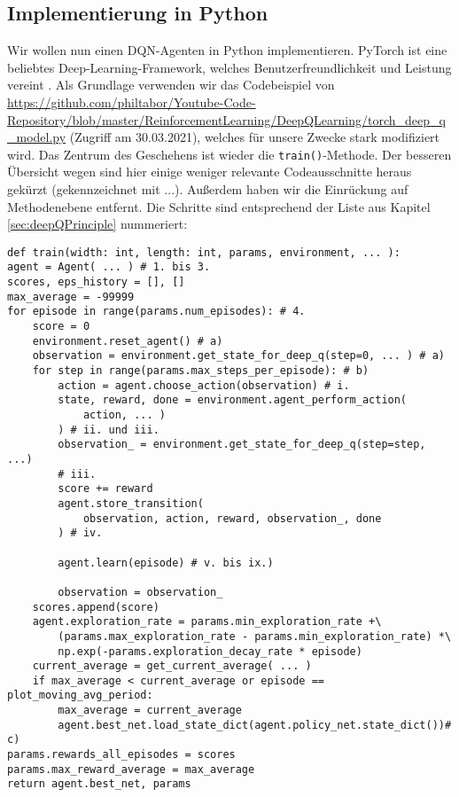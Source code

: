 \subsection{Implementierung in Python} \label{sec:deepQImplementation}
Wir wollen nun einen DQN-Agenten in Python implementieren. PyTorch ist eine beliebtes Deep-Learning-Framework, welches Benutzerfreundlichkeit und Leistung vereint \cite{x01_pytorch}. Als Grundlage verwenden wir das Codebeispiel von \url{https://github.com/philtabor/Youtube-Code-Repository/blob/master/ReinforcementLearning/DeepQLearning/torch_deep_q_model.py} (Zugriff am 30.03.2021), welches für unsere Zwecke stark modifiziert wird. Das Zentrum des Geschehens ist wieder die \texttt{train()}-Methode. Der besseren Übersicht wegen sind hier einige weniger relevante Codeausschnitte heraus gekürzt (gekennzeichnet mit ...). Außerdem haben wir die Einrückung auf Methodenebene entfernt. Die Schritte sind entsprechend der Liste aus Kapitel \ref{sec:deepQPrinciple} nummeriert:
\begin{verbatim}
def train(width: int, length: int, params, environment, ... ):
agent = Agent( ... ) # 1. bis 3.
scores, eps_history = [], []
max_average = -99999
for episode in range(params.num_episodes): # 4.
    score = 0
    environment.reset_agent() # a)
    observation = environment.get_state_for_deep_q(step=0, ... ) # a)
    for step in range(params.max_steps_per_episode): # b)
        action = agent.choose_action(observation) # i.
        state, reward, done = environment.agent_perform_action(
            action, ... )
        ) # ii. und iii.
        observation_ = environment.get_state_for_deep_q(step=step, ...)
        # iii.
        score += reward
        agent.store_transition(
            observation, action, reward, observation_, done
        ) # iv.

        agent.learn(episode) # v. bis ix.)

        observation = observation_
    scores.append(score)
    agent.exploration_rate = params.min_exploration_rate +\
        (params.max_exploration_rate - params.min_exploration_rate) *\
        np.exp(-params.exploration_decay_rate * episode)
    current_average = get_current_average( ... )
    if max_average < current_average or episode == plot_moving_avg_period:
        max_average = current_average
        agent.best_net.load_state_dict(agent.policy_net.state_dict())# c)
params.rewards_all_episodes = scores
params.max_reward_average = max_average
return agent.best_net, params
\end{verbatim}
